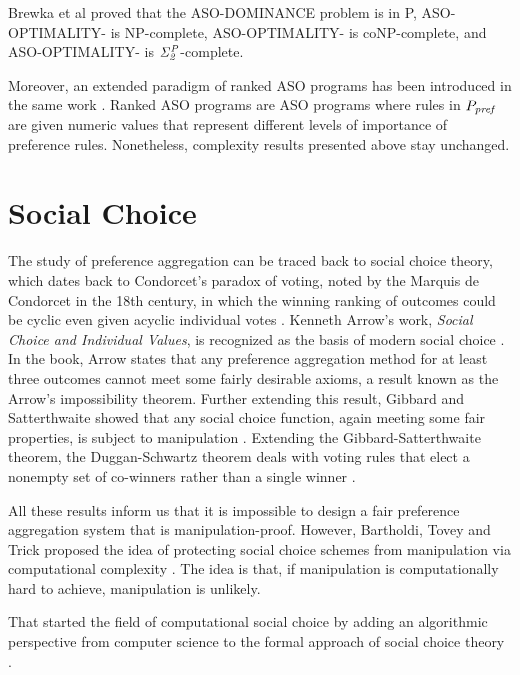 Brewka et al \cite{Brewka03answerset} proved that
the ASO-DOMINANCE problem is in P, ASO-OPTIMALITY-
is NP-complete, ASO-OPTIMALITY- is coNP-complete,
and ASO-OPTIMALITY- is $\mathit{\Sigma^P_{2}}$-complete.

Moreover, an extended paradigm of ranked ASO programs has
been introduced in the same work \cite{Brewka03answerset}.
Ranked ASO programs are ASO programs where rules in $P_{\mathit{pref}}$
are given numeric values that represent different levels of importance
of preference rules.  Nonetheless, complexity results presented
above stay unchanged.




\section{Social Choice}
The study of preference aggregation can be traced back to social choice theory,
which dates back to Condorcet's paradox of voting, noted by the
Marquis de Condorcet in the 18th century, in which
the winning ranking of outcomes could be cyclic even 
given acyclic individual votes \cite{wiki:soc}.
Kenneth Arrow's work, \textit{Social Choice and Individual Values},
is recognized as the basis of modern social choice \cite{aarrow:b:socialchoice}.
In the book, Arrow states that any preference aggregation method for at least three
outcomes cannot meet some fairly desirable axioms, a result known as
the Arrow's impossibility theorem.
Further extending this result, Gibbard and Satterthwaite showed
that any social choice function, again meeting some fair properties, is subject
to manipulation \cite{gib:j:maip-scheme,satt:j:strat-proof}.
Extending the Gibbard-Satterthwaite theorem, the Duggan-Schwartz theorem deals with 
voting rules that elect a nonempty set of co-winners rather than a single winner
\cite{dug-sch:j:maipres}.

All these results inform us that it is impossible to design a fair preference
aggregation system that is manipulation-proof.
However, Bartholdi, Tovey and Trick proposed the idea of protecting
social choice schemes from manipulation via computational
complexity \cite{bartholdi:j:whowon,bartholdi:j:compdiff,
bartholdi:j:howhard}.
The idea is that, if manipulation is computationally hard to
achieve, manipulation is unlikely.

That started the field of computational social choice by adding an algorithmic
perspective from computer science to the formal approach 
of social choice theory \cite{Brandt:COMSOC}.




